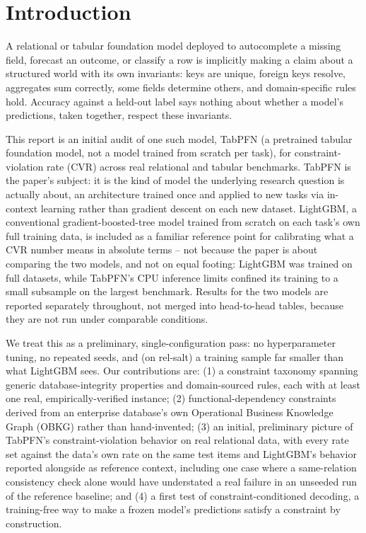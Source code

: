 \documentclass[11pt]{article}
\begin{document}
\section{Introduction}

A relational or tabular foundation model deployed to autocomplete a missing field, forecast an
outcome, or classify a row is implicitly making a claim about a structured world with its own
invariants: keys are unique, foreign keys resolve, aggregates sum correctly, some fields
determine others, and domain-specific rules hold. Accuracy against a held-out label says
nothing about whether a model's predictions, taken together, respect these invariants.

This report is an initial audit of one such model, TabPFN (a pretrained tabular foundation
model, not a model trained from scratch per task), for constraint-violation rate (CVR) across
real relational and tabular benchmarks. TabPFN is the paper's subject: it is the kind of model
the underlying research question is actually about, an architecture trained once and applied
to new tasks via in-context learning rather than gradient descent on each new dataset.
LightGBM, a conventional gradient-boosted-tree model trained from scratch on each task's own
full training data, is included as a familiar reference point for calibrating what a CVR
number means in absolute terms -- not because the paper is about comparing the two models, and
not on equal footing: LightGBM was trained on full datasets, while TabPFN's CPU inference
limits confined its training to a small subsample on the largest benchmark. Results for the two models
are reported separately throughout, not merged into head-to-head tables, because they are not
run under comparable conditions.

We treat this as a preliminary, single-configuration pass: no hyperparameter tuning, no
repeated seeds, and (on rel-salt) a training sample far smaller than what LightGBM sees. Our
contributions are: (1) a constraint taxonomy spanning generic database-integrity properties and
domain-sourced rules, each with at least one real, empirically-verified instance; (2)
functional-dependency constraints derived from an enterprise database's own Operational
Business Knowledge Graph (OBKG) rather than hand-invented; (3) an initial, preliminary picture
of TabPFN's constraint-violation behavior on real relational data, with every rate set against
the data's own rate on the same test items and LightGBM's behavior reported alongside as
reference context, including one case where a same-relation consistency check alone would have
understated a real failure in an unseeded run of the reference baseline; and (4) a first test of
constraint-conditioned decoding, a training-free way to make a frozen model's predictions
satisfy a constraint by construction.
\end{document}
